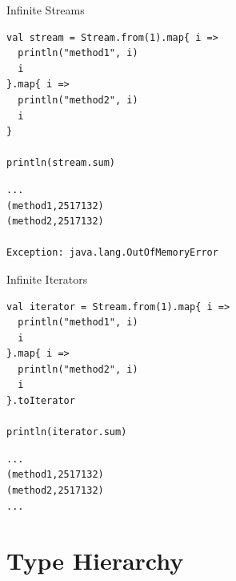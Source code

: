 \documentclass[xcolor=svgnames]{beamer}
\begin{document}
    \begin{frame}[fragile] %
    {Infinite Streams}
        \begin{Verbatim}[formatcom=\sffamily]
val stream = Stream.from(1).map{ i =>
  println("method1", i)
  i
}.map{ i =>
  println("method2", i)
  i
}

println(stream.sum)
        \end{Verbatim}

        \noindent\makebox[\linewidth]{\rule{\paperwidth}{0.4pt}}

        \pause

        \begin{Verbatim}[formatcom=\sffamily]
...
(method1,2517132)
(method2,2517132)

Exception: java.lang.OutOfMemoryError
        \end{Verbatim}
    \end{frame}

    \begin{frame}[fragile] %
    {Infinite Iterators}
        \begin{Verbatim}[formatcom=\sffamily]
val iterator = Stream.from(1).map{ i =>
  println("method1", i)
  i
}.map{ i =>
  println("method2", i)
  i
}.toIterator

println(iterator.sum)
        \end{Verbatim}

        \noindent\makebox[\linewidth]{\rule{\paperwidth}{0.4pt}}

        \pause

        \begin{Verbatim}[formatcom=\sffamily]
...
(method1,2517132)
(method2,2517132)
...
        \end{Verbatim}
    \end{frame}

    \section{Type Hierarchy}

\end{document}
